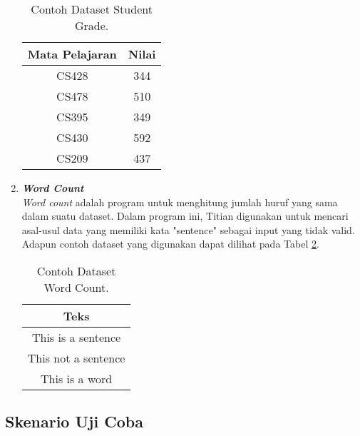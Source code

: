 \begin{enumerate}
            \begin{longtable}{|c|c|}
                  \caption{Contoh Dataset Student Grade.}
                  \label{tb:studentgradedataset} \\
                  \hline
                  \rowcolor[HTML]{C0C0C0}
                  \textbf{Mata Pelajaran} & \textbf{Nilai} \\
                  \hline
                  CS428 & 344 \\
                  CS478 & 510 \\
                  CS395 & 349 \\
                  CS430 & 592 \\
                  CS209 & 437 \\
                  \hline
            \end{longtable}

      \item \emph{\textbf{Word Count}} \\
            \emph{Word count} adalah program untuk menghitung jumlah huruf yang sama dalam suatu dataset. Dalam program ini, Titian digunakan untuk mencari asal-usul data yang memiliki kata "sentence" sebagai input yang tidak valid.
            Adapun contoh dataset yang digunakan dapat 
            dilihat pada Tabel \ref{tb:wordcountdataset}.

            \begin{longtable}{|c|}
                  \caption{Contoh Dataset Word Count.}
                  \label{tb:wordcountdataset} \\
                  \hline
                  \rowcolor[HTML]{C0C0C0}
                  \textbf{Teks} \\
                  \hline
                  This is a sentence \\
                  This not a sentence \\
                  This is a word \\
                  \hline
            \end{longtable}

\end{enumerate}


\subsection{Skenario Uji Coba}
\label{subsec:skenarioujicoba}

